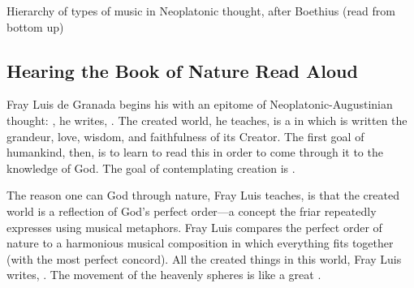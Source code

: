 
{Hierarchy of types of music in Neoplatonic thought, after Boethius (read from
bottom up)}

\subsection{Hearing the Book of Nature Read Aloud}

Fray Luis de Granada begins his  with an
epitome of Neoplatonic-Augustinian thought: , he writes, .%
    \Autocite[182]{LuisdeGranada:Simbolo}
The created world, he teaches, is a  in which is written
the grandeur, love, wisdom, and faithfulness of its Creator.
The first goal of humankind, then, is to learn to read this  in order to come through it to the knowledge of God. 
The goal of contemplating creation is .%
    \Autocite[184]{LuisdeGranada:Simbolo}


The reason one can  God through nature, Fray Luis teaches, is that
the created world is a reflection of God's perfect order---a concept the friar
repeatedly expresses using musical metaphors.
Fray Luis compares the perfect order of nature to a harmonious musical
composition in which everything fits together 
(with the most perfect concord).
All the created things in this world, Fray Luis writes, .%
    \Autocite[191]{LuisdeGranada:Simbolo}
The movement of the heavenly spheres is like a great .%
    \Autocite[191]{LuisdeGranada:Simbolo}

